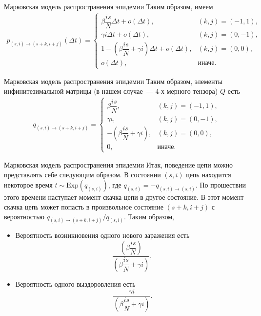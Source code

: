 \documentclass[aspectratio=169]{beamer}
\begin{document}
\begin{frame}{Марковская модель распространения эпидемии}
    Таким образом, имеем
    \begin{align*}
        p_{(s, i) \to (s+k, i+j)}(\Delta t) = 
        \begin{cases}
            \beta \dfrac{is}{N} \Delta t + o(\Delta t), & (k, j) = (-1, 1), \\
            \gamma i \Delta t + o(\Delta t), & (k, j) = (0, -1), \\
            1 - \left(\beta \dfrac{is}{N} + \gamma i \right)\Delta t + o(\Delta t), & (k, j) = (0, 0), \\
            o(\Delta t), & \text{иначе}.
        \end{cases}
    \end{align*}
\end{frame}
\begin{frame}{Марковская модель распространения эпидемии}
    Таким образом, элементы инфинитезимальной матрицы (в нашем случае~--- 4-х мерного тензора) $Q$ есть
    \begin{align*}
        q_{(s, i) \to (s+k, i+j)} = 
        \begin{cases}
            \beta \dfrac{is}{N}, & (k, j) = (-1, 1), \\
            \gamma i, & (k, j) = (0, -1), \\
            - \left(\beta \dfrac{is}{N} + \gamma i \right), & (k, j) = (0, 0), \\
            0, & \text{иначе}.
        \end{cases}
    \end{align*}
\end{frame}
\begin{frame}{Марковская модель распространения эпидемии}
    Итак, поведение цепи можно представлять себе следующим образом. В состоянии $(s, i)$ цепь находится некоторое время $t \sim \mathrm{Exp}(q_{(s, i)})$, где $q_{(s, i)} = - q_{(s, i) \to (s, i)}$. По прошествии этого времени наступает момент скачка цепи в другое состояние. В этот момент скачка цепь может попасть в произвольное состояние $(s+k, i+j)$ с вероятностью $q_{(s, i) \to (s+k, i+j)} / q_{(s, i)}$. Таким образом,
    \begin{itemize}
        \item Вероятность возникновения одного нового заражения есть
        \[ \dfrac{\left(\beta \dfrac{is}{N} \right)}{\left( \beta \dfrac{is}{N} + \gamma i \right)}, \]
        \item Вероятность одного выздоровления есть
        \[ \dfrac{\gamma i}{\left( \beta \dfrac{is}{N} + \gamma i \right)}. \]
    \end{itemize}
\end{frame}
\end{document}
